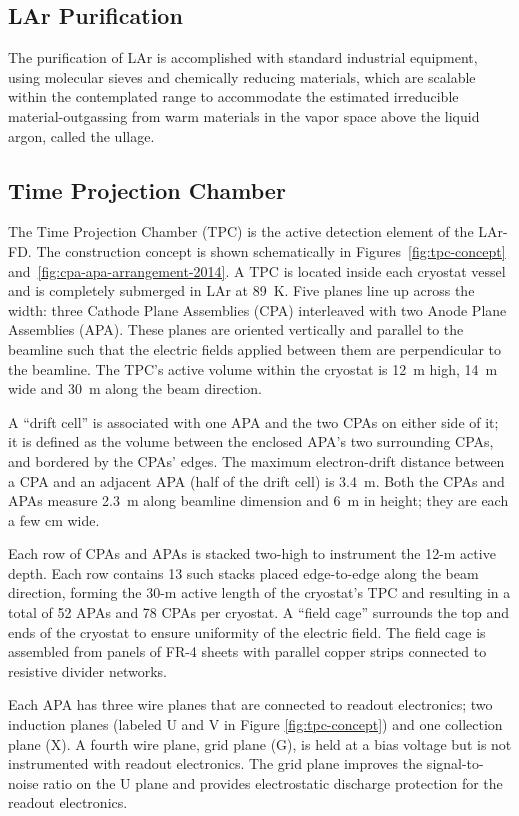 \subsection{LAr Purification}

The purification of LAr is accomplished with standard industrial equipment, using molecular sieves and chemically reducing materials, which are scalable within the contemplated range to accommodate the estimated irreducible material-outgassing from warm materials in the vapor space above the liquid argon, called the ullage. 


\subsection{Time Projection Chamber}

The Time Projection Chamber (TPC) is the active detection element of the LAr-FD. The construction concept is  shown schematically in Figures~\ref{fig:tpc-concept} and~\ref{fig:cpa-apa-arrangement-2014}.  A TPC is located
 inside each cryostat vessel and is completely submerged in LAr at 89~K. Five planes line up across the width: three Cathode Plane Assemblies (CPA)  
 interleaved with two Anode Plane Assemblies (APA). These planes are oriented vertically and 
 parallel to the beamline such that the electric fields applied between them are perpendicular to the beamline.  The TPC's active volume within the cryostat  is 12~m high, 14~m wide and 30~m along  
 the beam direction. 
 
 A ``drift cell'' is associated with one APA and the two CPAs on either 
 side of it; it is 
 defined as the volume between the enclosed APA's two surrounding CPAs, and bordered by the CPAs' edges.  The maximum electron-drift distance between a CPA and an adjacent APA (half 
 of the drift cell) is 3.4~m. Both the CPAs and APAs measure 2.3~m along beamline dimension and 6~m
 in height; they are each a few cm wide. 
 
 Each row of CPAs and APAs is 
 stacked two-high to instrument the 12-m active depth. Each row contains 13 such stacks placed edge-to-edge along the beam direction, forming the 30-m
 active length of the cryostat's TPC and resulting in a total of 52 APAs and 78 CPAs per cryostat. A ``field cage'' surrounds the top and ends of the cryostat to ensure uniformity of the electric field. The field cage is assembled from
 panels of FR-4 sheets with parallel copper strips connected to resistive divider networks.

Each APA has three wire planes that are connected to readout electronics; two induction planes (labeled U and V in Figure \ref{fig:tpc-concept}) and one collection plane (X). A fourth wire plane, grid plane (G), is held at a bias voltage but is not instrumented with readout electronics. The grid plane improves the signal-to-noise ratio on the U plane and provides electrostatic discharge protection for the readout electronics.

